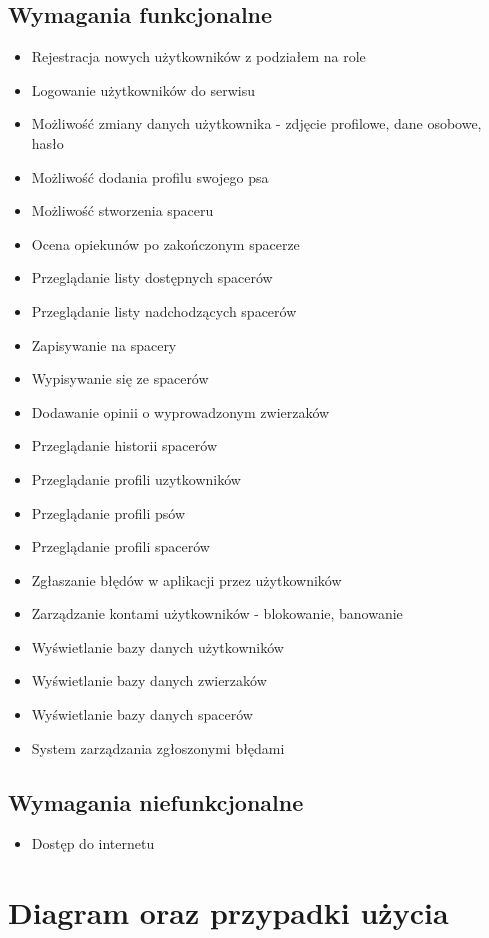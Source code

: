 \subsection{Wymagania funkcjonalne}
\begin{itemize}
    \item Rejestracja nowych użytkowników z podziałem na role
    \item Logowanie użytkowników do serwisu
    \item Możliwość zmiany danych użytkownika - zdjęcie profilowe, dane osobowe, hasło
    \item Możliwość dodania profilu swojego psa
    \item Możliwość stworzenia spaceru
    \item Ocena opiekunów po zakończonym spacerze
    \item Przeglądanie listy dostępnych spacerów
    \item Przeglądanie listy nadchodzących spacerów
    \item Zapisywanie na spacery
    \item Wypisywanie się ze spacerów
    \item Dodawanie opinii o wyprowadzonym zwierzaków
    \item Przeglądanie historii spacerów
    \item Przeglądanie profili uzytkowników
    \item Przeglądanie profili psów
    \item Przeglądanie profili spacerów
    \item Zgłaszanie błędów w aplikacji przez użytkowników
    \item Zarządzanie kontami użytkowników - blokowanie, banowanie
    \item Wyświetlanie bazy danych użytkowników
    \item Wyświetlanie bazy danych zwierzaków
    \item Wyświetlanie bazy danych spacerów
    \item System zarządzania zgłoszonymi błędami
\end{itemize}
\subsection{Wymagania niefunkcjonalne}
\begin{itemize}
    \item Dostęp do internetu
\end{itemize}
\section{Diagram oraz przypadki użycia}

